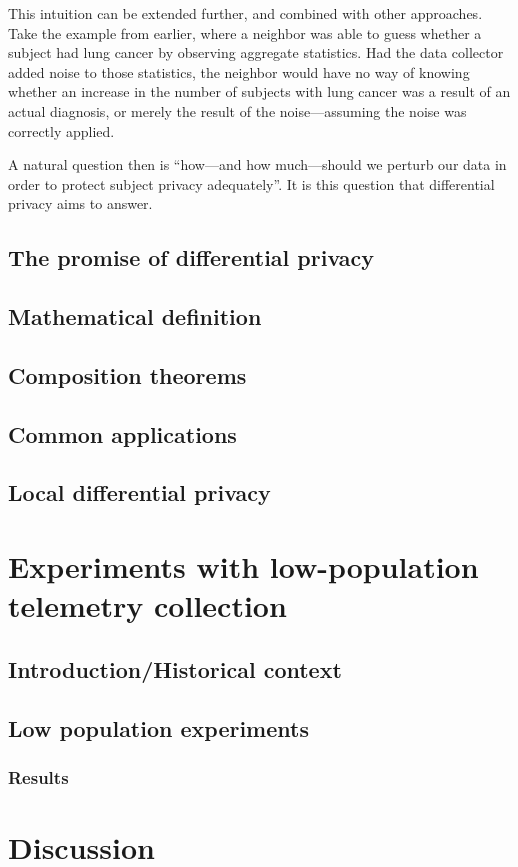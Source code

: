 This intuition can be extended further, and combined with other approaches. Take the example from earlier, where a neighbor was able to guess whether a subject had lung cancer by observing aggregate statistics. Had the data collector added noise to those statistics, the neighbor would have no way of knowing whether an increase in the number of subjects with lung cancer was a result of an actual diagnosis, or merely the result of the noise---assuming the noise was correctly applied. \bigskip

A natural question then is ``how---and how much---should we perturb our data in order to protect subject privacy adequately''. It is this question that differential privacy aims to answer.

\subsection{The promise of differential privacy \label{sec:promise}} 

\subsection{Mathematical definition}

\subsection{Composition theorems}

\subsection{Common applications}

\subsection{Local differential privacy}

\section{Experiments with low-population telemetry collection}

\subsection{Introduction/Historical context}

\subsection{Low population experiments}

\subsubsection{Results}

\section{Discussion}



